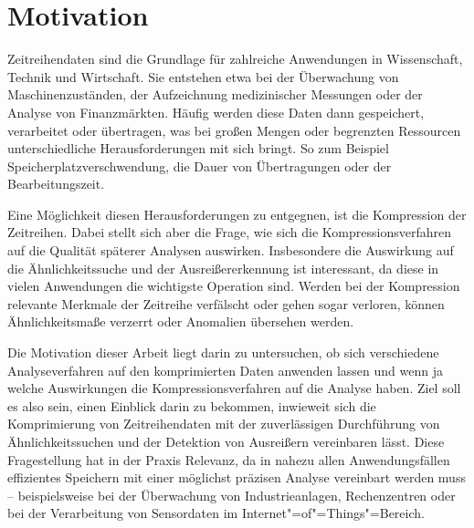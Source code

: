 \section{Motivation}

Zeitreihendaten sind die Grundlage für zahlreiche Anwendungen in Wissenschaft, Technik und Wirtschaft. Sie entstehen etwa bei der Überwachung von Maschinenzuständen, der Aufzeichnung medizinischer Messungen oder der Analyse von Finanzmärkten. Häufig werden diese Daten dann gespeichert, verarbeitet oder übertragen, was bei großen Mengen oder begrenzten Ressourcen unterschiedliche Herausforderungen mit sich bringt. So zum Beispiel Speicherplatzverschwendung, die Dauer von Übertragungen oder der Bearbeitungszeit.

Eine Möglichkeit diesen Herausforderungen zu entgegnen, ist die Kompression der Zeitreihen. Dabei stellt sich aber die Frage, wie sich die Kompressionsverfahren auf die Qualität späterer Analysen auswirken. Insbesondere die Auswirkung auf die Ähnlichkeitssuche und der Ausreißererkennung ist interessant, da diese in vielen Anwendungen die wichtigste Operation sind. Werden bei der Kompression relevante Merkmale der Zeitreihe verfälscht oder gehen sogar verloren, können Ähnlichkeitsmaße verzerrt oder Anomalien übersehen werden.

Die Motivation dieser Arbeit liegt darin zu untersuchen, ob sich verschiedene Analyseverfahren auf den komprimierten Daten anwenden lassen und wenn ja welche Auswirkungen die Kompressionsverfahren auf die Analyse haben. Ziel soll es also sein, einen Einblick darin zu bekommen, inwieweit sich die Komprimierung von Zeitreihendaten mit der zuverlässigen Durchführung von Ähnlichkeitssuchen und der Detektion von Ausreißern vereinbaren lässt. Diese Fragestellung hat in der Praxis Relevanz, da in nahezu allen Anwendungsfällen effizientes Speichern mit einer möglichst präzisen Analyse vereinbart werden muss -- beispielsweise bei der Überwachung von Industrieanlagen, Rechenzentren oder bei der Verarbeitung von Sensordaten im Internet"=of"=Things"=Bereich.
